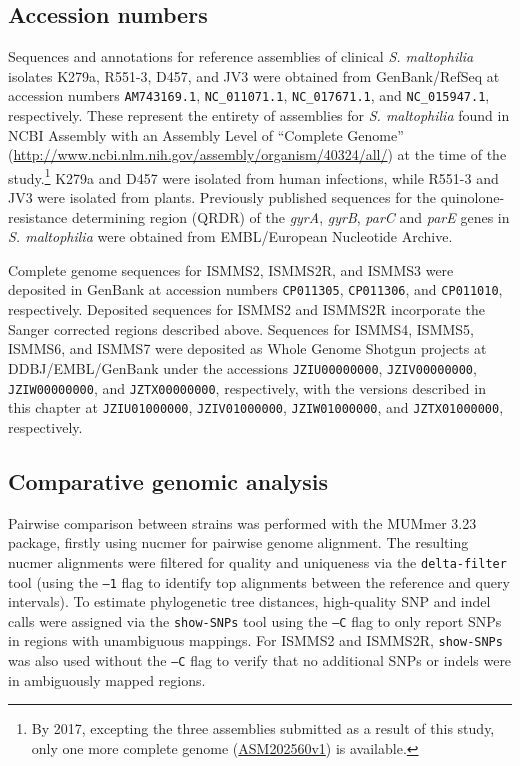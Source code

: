 \subsection{Accession numbers}

Sequences and annotations for reference assemblies of clinical \emph{S. maltophilia} isolates K279a, R551-3, D457, and JV3 were obtained from GenBank/RefSeq at accession numbers \texttt{AM743169.1}, \texttt{NC\_011071.1}, \texttt{NC\_017671.1}, and \texttt{NC\_015947.1}, respectively. These represent the entirety of assemblies for \emph{S. maltophilia} found in NCBI Assembly with an Assembly Level of “Complete Genome” (\url{http://www.ncbi.nlm.nih.gov/assembly/organism/40324/all/}) at the time of the study.\footnote{By 2017, excepting the three assemblies submitted as a result of this study, only one more complete genome (\href{https://www.ncbi.nlm.nih.gov/assembly/GCF\_002025605.1/}{ASM202560v1}) is available.} K279a and D457 were isolated from human infections, while R551-3 and JV3 were isolated from plants. Previously published sequences for the quinolone-resistance determining region (QRDR) of the \emph{gyrA}, \emph{gyrB}, \emph{parC} and \emph{parE} genes in \emph{S. maltophilia}\autocite{Valdezate2002} were obtained from EMBL/European Nucleotide Archive.

Complete genome sequences for ISMMS2, ISMMS2R, and ISMMS3 were deposited in GenBank at accession numbers \texttt{CP011305}, \texttt{CP011306}, and \texttt{CP011010}, respectively. Deposited sequences for ISMMS2 and ISMMS2R incorporate the Sanger corrected regions described above. Sequences for ISMMS4, ISMMS5, ISMMS6, and ISMMS7 were deposited as Whole Genome Shotgun projects at DDBJ/EMBL/GenBank under the accessions \texttt{JZIU00000000}, \texttt{JZIV00000000}, \texttt{JZIW00000000}, and \texttt{JZTX00000000}, respectively, with the versions described in this chapter at \texttt{JZIU01000000}, \texttt{JZIV01000000}, \texttt{JZIW01000000}, and \texttt{JZTX01000000}, respectively.

\subsection{Comparative genomic analysis}

Pairwise comparison between strains was performed with the MUMmer 3.23 package,\autocite{Delcher2003} firstly using nucmer for pairwise genome alignment. The resulting nucmer alignments were filtered for quality and uniqueness via the \texttt{delta-filter} tool (using the \texttt{–1} flag to identify top alignments between the reference and query intervals). To estimate phylogenetic tree distances, high-quality SNP and indel calls were assigned via the \texttt{show-SNPs} tool using the \texttt{–C} flag to only report SNPs in regions with unambiguous mappings. For ISMMS2 and ISMMS2R, \texttt{show-SNPs} was also used without the \texttt{–C} flag to verify that no additional SNPs or indels were in ambiguously mapped regions.

